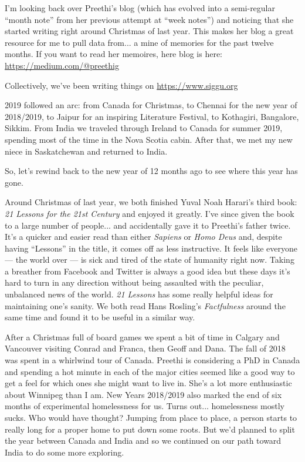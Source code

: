 \documentclass{article}
\begin{document}
I'm looking back over Preethi's blog (which has evolved into a semi-regular ``month
note'' from her previous attempt at ``week notes'') and noticing that she started
writing right around Christmas of last year. This makes her blog a great resource for
me to pull data from... a mine of memories for the past twelve months. If you want to
read her memoires, here blog is here: \url{https://medium.com/@preethig}

Collectively, we've been writing things on \url{https://www.siggu.org}

2019 followed an arc: from Canada for Christmas, to Chennai for the new year of 2018/2019,
to Jaipur for an inspiring Literature Festival, to Kothagiri, Bangalore,
Sikkim. From India we traveled through Ireland to Canada for summer 2019, spending
most of the time in the Nova Scotia cabin. After that, we met my new niece in
Saskatchewan and returned to India.

So, let's rewind back to the new year of 12 months ago to see where this year has gone.

Around Christmas of last year, we both finished Yuval Noah Harari's third book:
\textit{21 Lessons for the 21st Century} and enjoyed it greatly. I've since given the
book to a large number of people... and accidentally gave it to Preethi's father
twice. It's a quicker and easier read than either \textit{Sapiens} or \textit{Homo
  Deus} and, despite having ``Lessons'' in the title, it comes off as less
instructive. It feels like everyone --- the world over --- is sick and tired of the
state of humanity right now. Taking a breather from Facebook and Twitter is always a
good idea but these days it's hard to turn in any direction without being assaulted
with the peculiar, unbalanced news of the world. \textit{21 Lessons} has some really
helpful ideas for maintaining one's sanity. We both read Hans Rosling's
\textit{Factfulness} around the same time and found it to be useful in a similar
way.

After a Christmas full of board games we spent a bit of time in Calgary and Vancouver
visiting Conrad and Franca, then Geoff and Dana. The fall of 2018 was spent in a whirlwind
tour of Canada. Preethi is
considering a PhD in Canada and spending a hot minute in each of the major cities
seemed like a good way to get a feel for which ones she might want to live in. She's
a lot more enthusiastic about Winnipeg than I am. New Years 2018/2019 also marked the end
of six months of experimental homelessness for
us. Turns out... homelessness mostly sucks. Who would have thought? Jumping from
place to place, a person starts to
really long for a proper home to put down some roots. But we'd planned to split the
year between Canada and India and so we continued on our path toward India to do some
more exploring.
\end{document}
